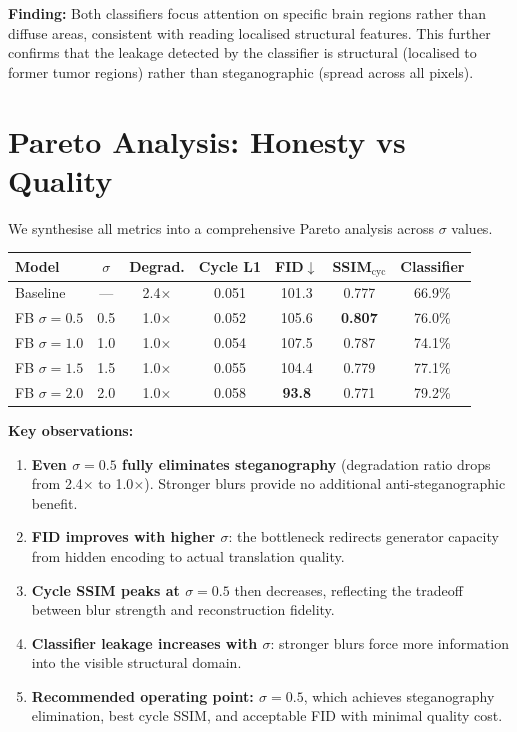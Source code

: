 \documentclass[11pt,a4paper]{article}
\theoremstyle{definition}
\begin{document}
\textbf{Finding:} Both classifiers focus attention on specific brain regions rather than diffuse areas, consistent with reading localised structural features. This further confirms that the leakage detected by the classifier is structural (localised to former tumor regions) rather than steganographic (spread across all pixels).

\section{Pareto Analysis: Honesty vs Quality}

We synthesise all metrics into a comprehensive Pareto analysis across $\sigma$ values.

\begin{center}
\begin{tabular}{lcccccc}
\toprule
Model & $\sigma$ & Degrad. & Cycle L1 & FID$\downarrow$ & SSIM$_{\text{cyc}}$ & Classifier \\
\midrule
Baseline & --- & 2.4$\times$ & 0.051 & 101.3 & 0.777 & 66.9\% \\
FB $\sigma=0.5$ & 0.5 & 1.0$\times$ & 0.052 & 105.6 & \textbf{0.807} & 76.0\% \\
FB $\sigma=1.0$ & 1.0 & 1.0$\times$ & 0.054 & 107.5 & 0.787 & 74.1\% \\
FB $\sigma=1.5$ & 1.5 & 1.0$\times$ & 0.055 & 104.4 & 0.779 & 77.1\% \\
FB $\sigma=2.0$ & 2.0 & 1.0$\times$ & 0.058 & \textbf{93.8} & 0.771 & 79.2\% \\
\bottomrule
\end{tabular}
\end{center}

\textbf{Key observations:}
\begin{enumerate}
    \item \textbf{Even $\sigma = 0.5$ fully eliminates steganography} (degradation ratio drops from 2.4$\times$ to 1.0$\times$). Stronger blurs provide no additional anti-steganographic benefit.
    \item \textbf{FID improves with higher $\sigma$}: the bottleneck redirects generator capacity from hidden encoding to actual translation quality.
    \item \textbf{Cycle SSIM peaks at $\sigma = 0.5$} then decreases, reflecting the tradeoff between blur strength and reconstruction fidelity.
    \item \textbf{Classifier leakage increases with $\sigma$}: stronger blurs force more information into the visible structural domain.
    \item \textbf{Recommended operating point: $\sigma = 0.5$}, which achieves steganography elimination, best cycle SSIM, and acceptable FID with minimal quality cost.
\end{enumerate}
\end{document}
